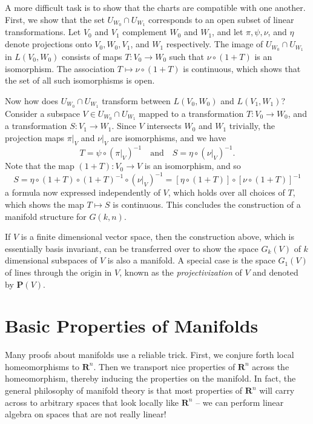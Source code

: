 \begin{example}[Grassmannian]
    A more difficult task is to show that the charts are compatible with one another. First, we show that the set $U_{W_0} \cap U_{W_1}$ corresponds to an open subset of linear transformations. Let $V_0$ and $V_1$ complement $W_0$ and $W_1$, and let $\pi, \psi, \nu$, and $\eta$ denote projections onto $V_0, W_0, V_1$, and $W_1$ respectively. The image of $U_{W_0} \cap U_{W_1}$ in $L(V_0,W_0)$ consists of maps $T: V_0 \to W_0$ such that $\nu \circ (1 + T)$ is an isomorphism. The association $T \mapsto \nu \circ (1 + T)$ is continuous, which shows that the set of all such isomorphisms is open.

    Now how does $U_{W_0} \cap U_{W_1}$ transform between $L(V_0,W_0)$ and $L(V_1,W_1)$? Consider a subspace $V \in U_{W_0} \cap U_{W_1}$ mapped to a transformation $T: V_0 \to W_0$, and a transformation $S: V_1 \to W_1$. Since $V$ intersects $W_0$ and $W_1$ trivially, the projection maps $\pi|_V$ and $\nu|_V$ are isomorphisms, and we have
    \[ T = \psi \circ (\pi|_V)^{-1} \quad\text{and}\quad S = \eta \circ (\nu|_V)^{-1}. \]
    Note that the map $(1 + T): V_0 \to V$ is an isomorphism, and so
    \[ S = \eta \circ (1 + T) \circ (1 + T)^{-1} \circ (\nu|_V)^{-1} = [\eta \circ (1 + T)] \circ [\nu \circ (1 + T)]^{-1} \]
    a formula now expressed independently of $V$, which holds over all choices of $T$, which shows the map $T \mapsto S$ is continuous. This concludes the construction of a manifold structure for $G(k,n)$.
\end{example}

\begin{remark}
    If $V$ is a finite dimensional vector space, then the construction above, which is essentially basis invariant, can be transferred over to  show the space $G_k(V)$ of $k$ dimensional subspaces of $V$ is also a manifold. A special case is the space $G_1(V)$ of lines through the origin in $V$, known as the \emph{projectivization} of $V$ and denoted by $\mathbf{P}(V)$.
\end{remark}

\section{Basic Properties of Manifolds}

Many proofs about manifolds use a reliable trick. First, we conjure forth local homeomorphisms to $\mathbf{R}^n$. Then we transport nice properties of $\mathbf{R}^n$ across the homeomorphism, thereby inducing the properties on the manifold. In fact, the general philosophy of manifold theory is that most properties of $\mathbf{R}^n$ will carry across to arbitrary spaces that look locally like $\mathbf{R}^n$ -- we can perform linear algebra on spaces that are not really linear!

